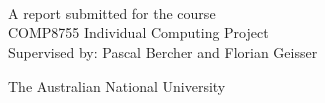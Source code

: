 \begin{titlepage}
  \enlargethispage{2cm}
  \begin{center}
    \makeatletter
    \Huge\textbf{\@title} \\[.4cm]
    \Huge\textbf{\thesisqualifier} \\[2.5cm]
    \huge\textbf{\@author} \\[9cm]
    \makeatother
    \LARGE A report submitted for the course \\
    COMP8755 Individual Computing Project \\
    Supervised by: Pascal Bercher and Florian Geisser
    
    The Australian National University \\[2cm]
    \thismonth

    \vspace*{\fill}
    \makeatletter
        {\selectfont\textcopyright}\ \@author{} \number\year
        \makeatother
    
  \end{center}
\end{titlepage}
